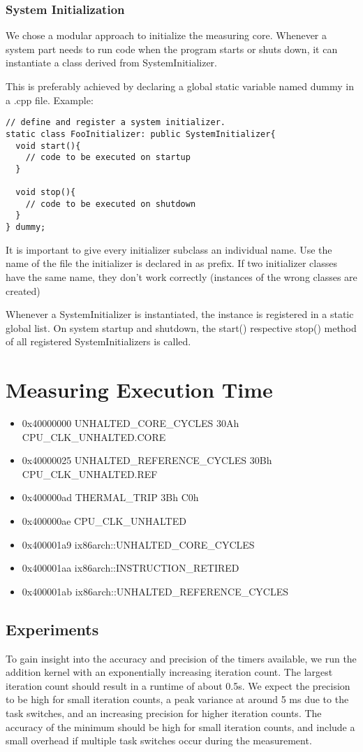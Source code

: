 \documentclass[a4paper,12pt]{article}
\begin{document}
\subsubsection{System Initialization}
We chose a modular approach to initialize the measuring core. Whenever a system
part needs to run code when the program starts or shuts down, it can instantiate
a class derived from SystemInitializer.

This is preferably achieved by declaring a global static variable named dummy
in a .cpp file. Example:
\begin{verbatim}
// define and register a system initializer.
static class FooInitializer: public SystemInitializer{
  void start(){
    // code to be executed on startup
  }

  void stop(){
    // code to be executed on shutdown
  }
} dummy;
\end{verbatim}

It is important to give every initializer subclass an individual name. Use the
name of the file the initializer is declared in as prefix. If two initializer
classes have the same name, they don't work correctly (instances of the wrong
classes are created)

Whenever a SystemInitializer is instantiated, the instance is registered in a
static global list. On system startup and shutdown, the start() respective
stop() method of all registered SystemInitializers is called.

\section{Measuring Execution Time}
\begin{itemize}
\item 0x40000000   UNHALTED\_CORE\_CYCLES 30Ah CPU\_CLK\_UNHALTED.CORE
\item 0x40000025   UNHALTED\_REFERENCE\_CYCLES 30Bh CPU\_CLK\_UNHALTED.REF
\item 0x400000ad   THERMAL\_TRIP 3Bh C0h 
\item 0x400000ae   CPU\_CLK\_UNHALTED
\item 0x400001a9   ix86arch::UNHALTED\_CORE\_CYCLES
\item 0x400001aa   ix86arch::INSTRUCTION\_RETIRED
\item 0x400001ab   ix86arch::UNHALTED\_REFERENCE\_CYCLES 
\end{itemize}

\subsection{Experiments}
To gain insight into the accuracy and precision of the timers available, we run
the addition kernel with an exponentially increasing iteration count. The
largest iteration count should result in a runtime of about 0.5s. We expect the
precision to be high for small iteration counts, a peak variance at around 5 ms
due to the task switches, and an increasing precision for higher iteration
counts. The accuracy of the minimum should be high for small iteration counts,
and include a small overhead if multiple task switches occur during the
measurement.
\end{document}

